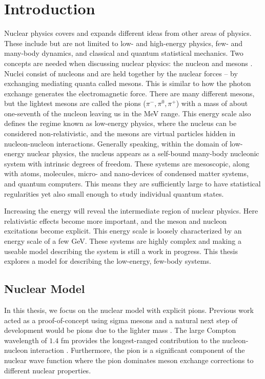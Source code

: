 \mainmatter
\chapter{Introduction}
Nuclear physics covers and expands different ideas from other areas of physics. These include but are not limited to low- and high-energy physics, few- and many-body dynamics, and classical and quantum statistical mechanics. Two concepts are needed when discussing nuclear physics: the nucleon and mesons \cite{KerneII}. Nuclei consist of nucleons and are held together by the nuclear forces -- by exchanging mediating quanta called mesons. This is similar to how the photon exchange generates the electromagnetic force. There are many different mesons, but the lightest mesons are called the pions ($\pi^-,\pi^0,\pi^+$) with a mass of about one-seventh of the nucleon leaving us in the MeV range. This energy scale also defines the regime known as low-energy physics, where the nucleus can be considered non-relativistic, and the mesons are virtual particles hidden in nucleon-nucleon interactions.
Generally speaking, within the domain of low-energy nuclear physics, the nucleus appears as a self-bound many-body nucleonic system with intrinsic degrees of freedom. These systems are mesoscopic, along with atoms, molecules, micro- and nano-devices of condensed matter systems, and quantum computers. This means they are sufficiently large to have statistical regularities yet also small enough to study individual quantum states.

Increasing the energy will reveal the intermediate region of nuclear physics. Here relativistic effects become more important, and the meson and nucleon excitations become explicit. This energy scale is loosely characterized by an energy scale of a few GeV. These systems are highly complex and making a useable model describing the system is still a work in progress. This thesis explores a model for describing the low-energy, few-body systems.
\section{Nuclear Model}
In this thesis, we focus on the nuclear model with explicit pions. Previous work acted as a proof-of-concept using sigma mesons and a natural next step of development would be pions due to the lighter mass \cite{Fedorov2020}. The large Compton wavelength of $1.4$ fm provides the longest-ranged contribution to the nucleon-nucleon interaction \cite{PionBib}. 
Furthermore, the pion is a significant component of the nuclear wave function where the pion dominates meson exchange corrections to different nuclear properties.

